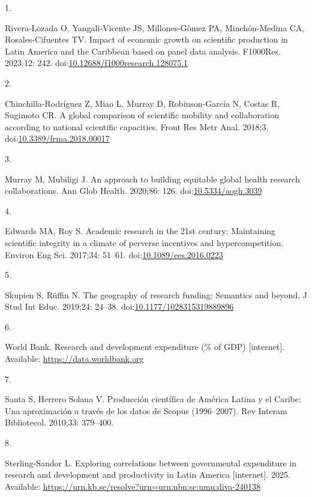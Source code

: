 \documentclass[
  letterpaper,
  DIV=11,
  numbers=noendperiod]{scrartcl}
\newlength{\cslhangindent}
\newlength{\csllabelwidth}
\newenvironment{CSLReferences}[2] %
 {\begin{list}{}{%
  \setlength{\itemindent}{0pt}
  \setlength{\leftmargin}{0pt}
  \setlength{\parsep}{0pt}
  \ifodd #1
   \setlength{\leftmargin}{\cslhangindent}
   \setlength{\itemindent}{-1\cslhangindent}
  \fi
  \setlength{\itemsep}{#2\baselineskip}}}
 {\end{list}}
\newcommand{\CSLLeftMargin}[1]{\parbox[t]{\csllabelwidth}{\strut#1\strut}}
\newcommand{\CSLRightInline}[1]{\parbox[t]{\linewidth - \csllabelwidth}{\strut#1\strut}}
\begin{document}
\protect{}\label{refs}
\begin{CSLReferences}{0}{1}
\CSLLeftMargin{1. }%
\CSLRightInline{Rivera-Lozada O, Yangali-Vicente JS, Millones-Gòmez PA,
Minchón-Medina CA, Rosales-Cifuentes TV. Impact of economic growth on
scientific production in {Latin America} and the {Caribbean} based on
panel data analysis. F1000Res. 2023;12: 242.
doi:\href{https://doi.org/10.12688/f1000research.128075.1}{10.12688/f1000research.128075.1}}

\CSLLeftMargin{2. }%
\CSLRightInline{Chinchilla-Rodríguez Z, Miao L, Murray D,
Robinson-García N, Costas R, Sugimoto CR. A global comparison of
scientific mobility and collaboration according to national scientific
capacities. Front Res Metr Anal. 2018;3.
doi:\href{https://doi.org/10.3389/frma.2018.00017}{10.3389/frma.2018.00017}}

\CSLLeftMargin{3. }%
\CSLRightInline{Murray M, Mubiligi J. An approach to building equitable
global health research collaborations. Ann Glob Health. 2020;86: 126.
doi:\href{https://doi.org/10.5334/aogh.3039}{10.5334/aogh.3039}}

\CSLLeftMargin{4. }%
\CSLRightInline{Edwards MA, Roy S. Academic research in the 21st
century: Maintaining scientific integrity in a climate of perverse
incentives and hypercompetition. Environ Eng Sci. 2017;34: 51--61.
doi:\href{https://doi.org/10.1089/ees.2016.0223}{10.1089/ees.2016.0223}}

\CSLLeftMargin{5. }%
\CSLRightInline{Skupien S, Rüffin N. The geography of research funding:
Semantics and beyond. J Stud Int Educ. 2019;24: 24--38.
doi:\href{https://doi.org/10.1177/1028315319889896}{10.1177/1028315319889896}}

\CSLLeftMargin{6. }%
\CSLRightInline{World Bank. Research and development expenditure (\% of
{GDP}) {[}internet{]}. Available: \url{https://data.worldbank.org}}

\CSLLeftMargin{7. }%
\CSLRightInline{Santa S, Herrero Solana V. Producci{ó}n cient{í}fica de
{Am{é}rica Latina} y el {Caribe}: Una aproximaci{ó}n a trav{é}s de los
datos de {Scopus} (1996--2007). Rev Interam Bibliotecol. 2010;33:
379--400. }

\CSLLeftMargin{8. }%
\CSLRightInline{Sterling-Sandor L. Exploring correlations between
governmental expenditure in research and development and productivity in
{Latin America} {[}internet{]}. 2025. Available:
\url{https://urn.kb.se/resolve?urn=urn:nbn:se:umu:diva-240138}}


\end{CSLReferences}
\end{document}
